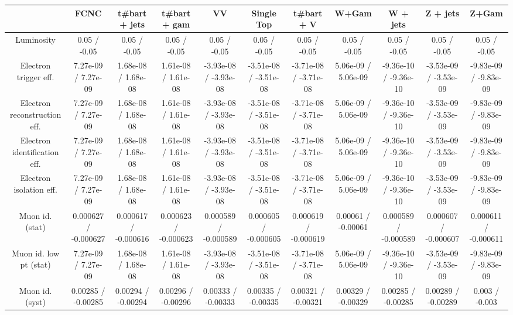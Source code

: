 \begin{table}[htbp]
\begin{center}
\footnotesize
\begin{tabular}{|c|c|c|c|c|c|c|c|c|c|c|}
\hline 
      & FCNC      & t#bar{t} + jets      & t#bar{t} +  gam      & VV      & Single Top      & t#bar{t} + V      & W+Gam      & W + jets      & Z + jets      & Z+Gam \\ 
\hline 
  Luminosity & 0.05 / -0.05 & 0.05 / -0.05 & 0.05 / -0.05 & 0.05 / -0.05 & 0.05 / -0.05 & 0.05 / -0.05 & 0.05 / -0.05 & 0.05 / -0.05 & 0.05 / -0.05 & 0.05 / -0.05 \\ 
  Electron trigger eff. & 7.27e-09 / 7.27e-09 & 1.68e-08 / 1.68e-08 & 1.61e-08 / 1.61e-08 & -3.93e-08 / -3.93e-08 & -3.51e-08 / -3.51e-08 & -3.71e-08 / -3.71e-08 & 5.06e-09 / 5.06e-09 & -9.36e-10 / -9.36e-10 & -3.53e-09 / -3.53e-09 & -9.83e-09 / -9.83e-09 \\ 
  Electron reconstruction eff. & 7.27e-09 / 7.27e-09 & 1.68e-08 / 1.68e-08 & 1.61e-08 / 1.61e-08 & -3.93e-08 / -3.93e-08 & -3.51e-08 / -3.51e-08 & -3.71e-08 / -3.71e-08 & 5.06e-09 / 5.06e-09 & -9.36e-10 / -9.36e-10 & -3.53e-09 / -3.53e-09 & -9.83e-09 / -9.83e-09 \\ 
  Electron identification eff. & 7.27e-09 / 7.27e-09 & 1.68e-08 / 1.68e-08 & 1.61e-08 / 1.61e-08 & -3.93e-08 / -3.93e-08 & -3.51e-08 / -3.51e-08 & -3.71e-08 / -3.71e-08 & 5.06e-09 / 5.06e-09 & -9.36e-10 / -9.36e-10 & -3.53e-09 / -3.53e-09 & -9.83e-09 / -9.83e-09 \\ 
  Electron isolation eff. & 7.27e-09 / 7.27e-09 & 1.68e-08 / 1.68e-08 & 1.61e-08 / 1.61e-08 & -3.93e-08 / -3.93e-08 & -3.51e-08 / -3.51e-08 & -3.71e-08 / -3.71e-08 & 5.06e-09 / 5.06e-09 & -9.36e-10 / -9.36e-10 & -3.53e-09 / -3.53e-09 & -9.83e-09 / -9.83e-09 \\ 
  Muon id. (stat) & 0.000627 / -0.000627 & 0.000617 / -0.000616 & 0.000623 / -0.000623 & 0.000589 / -0.000589 & 0.000605 / -0.000605 & 0.000619 / -0.000619 & 0.00061 / -0.00061 & 0.000589 / -0.000589 & 0.000607 / -0.000607 & 0.000611 / -0.000611 \\ 
  Muon id. low pt (stat) & 7.27e-09 / 7.27e-09 & 1.68e-08 / 1.68e-08 & 1.61e-08 / 1.61e-08 & -3.93e-08 / -3.93e-08 & -3.51e-08 / -3.51e-08 & -3.71e-08 / -3.71e-08 & 5.06e-09 / 5.06e-09 & -9.36e-10 / -9.36e-10 & -3.53e-09 / -3.53e-09 & -9.83e-09 / -9.83e-09 \\ 
  Muon id. (syst) & 0.00285 / -0.00285 & 0.00294 / -0.00294 & 0.00296 / -0.00296 & 0.00333 / -0.00333 & 0.00335 / -0.00335 & 0.00321 / -0.00321 & 0.00329 / -0.00329 & 0.00285 / -0.00285 & 0.00289 / -0.00289 & 0.003 / -0.003 \\ 

\end{tabular}
\end{center}
\end{table}
